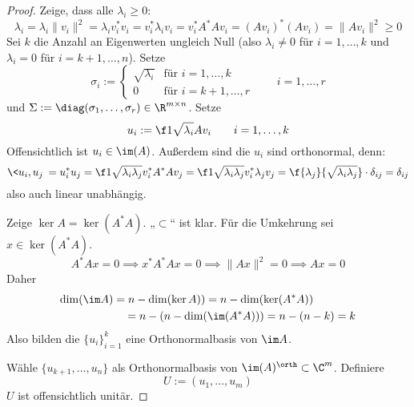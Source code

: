 \documentclass[11pt]{scrartcl}
\begin{document}
\begin{st}
\begin{proof}
		Zeige, dass alle $\lambda_i \ge 0$:
		\[
			\lambda_i = \lambda_i \|v_i\|^2 = \lambda_iv_i^*v_i = v_i^* \lambda_i v_i = v_i^* A^*A v_i = (A v_i)^*(A v_i) =  \|Av_i\|^2 \ge 0
		\]
		Sei $k$ die Anzahl an Eigenwerten ungleich Null (also $\lambda_i \neq 0$ für $i=1,\dotsc,k$ und $\lambda_i=0$ für $i=k+1,\dotsc,n$).
		Setze 
		\[
			\sigma_i := \begin{cases}
				\sqrt{\lambda_i} & \text{für $i=1,\dotsc,k$} \\
				0 & \text{für $i=k+1,\dotsc, r$}
			\end{cases}
			\qquad i = 1,\dotsc,r
		\]
		und $\Sigma := \diag(\sigma_1,\dotsc,\sigma_r) \in \R^{m\times n}$.
		Setze 
		\[
			u_i := \f 1{\sqrt{\lambda_i}}Av_i
			\qquad i = 1,\dotsc, k
		\]
		Offensichtlich ist $u_i\in \im(A)$.
		Außerdem sind die $u_i$ sind orthonormal, denn:
		\[
			\<u_i,u_j\> 
			= u_i^*u_j 
			= \f 1{\sqrt{\lambda_i \lambda_j}} v_i^* A^*Av_j
			= \f 1{\sqrt{\lambda_i\lambda_j}}v_i^* \lambda_j v_j
			= \f {\lambda_j} {\sqrt{\lambda_i \lambda_j}}\cdot \delta_{ij} 
			= \delta_{ij}
		\]
		also auch linear unabhängig.

		Zeige $\ker A = \ker (A^*A)$.
		„$\subset$“ ist klar.
		Für die Umkehrung sei $x\in \ker (A^* A)$.
		\[
			A^*A x = 0 \implies x^*A^*Ax = 0 \implies \|Ax\|^2 = 0 \implies Ax=0
		\]
		Daher
		\begin{align*}
			\dim(\im A) 
			&= n - \dim (\ker A)) 
			= n-\dim (\ker(A^*A))  \\
			&\quad = n- (n- \dim(\im(A^*A))) 
			= n-(n-k) = k
		\end{align*}
		Also bilden die $\{u_i\}_{i=1}^k$ eine Orthonormalbasis von $\im A$.

		Wähle $\{u_{k+1},\dotsc, u_n\}$ als Orthonormalbasis von $\im( A)^\orth \subset \C^m$.
		Definiere 
		\[
			U := (u_1,\dotsc, u_m)
		\]
		$U$ ist offensichtlich unitär.


\end{proof}
\end{st}
\end{document}
